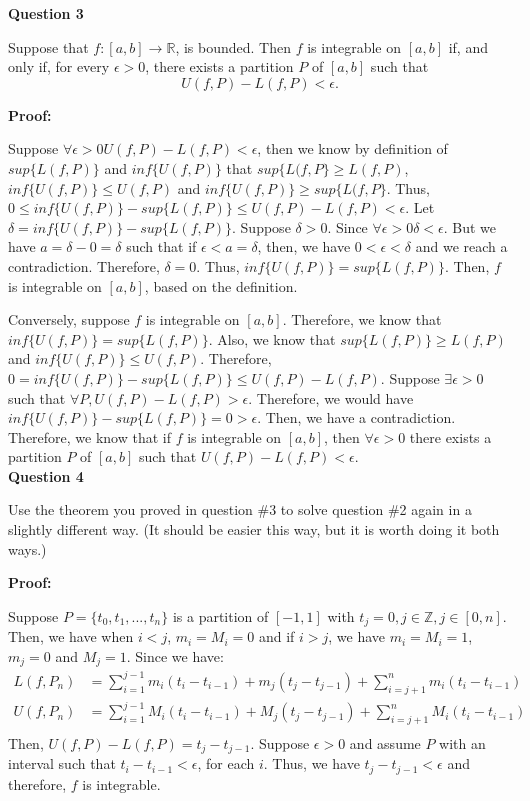 \documentclass[a4paper,12pt]{report}
\newcommand{\R}{\mathbb{R}}
\begin{document}
\noindent
\textbf{Question 3}

\noindent
Suppose that $f:[a,b]\to\R$,
is bounded. Then $f$ is integrable on $[a,b]$
if, and only if, for every $\epsilon>0$, there
exists a partition $P$ of $[a,b]$ such
that
\[
U(f,P)-L(f,P)<\epsilon.
\]

\noindent
\textbf{Proof: }

\noindent
Suppose $\forall \epsilon > 0U(f,P)-L(f,P)<\epsilon $, then we know by definition of $sup\{L(f,P)\}$ and $inf\{U(f,P)\}$ that $sup\{L(f,P\}\geq L(f,P)$, $inf\{U(f,P)\}\leq U(f,P)$ and $inf\{U(f,P)\}\geq sup\{L(f,P\}$. Thus, $0\leq inf\{U(f,P)\}-sup\{L(f,P)\}\leq U(f,P)-L(f,P)<\epsilon$. Let $\delta=inf\{U(f,P)\}-sup\{L(f,P)\}$. Suppose $\delta > 0$. Since $\forall \epsilon>0 \delta<\epsilon$. But we have $a=\delta-0=\delta$ such that if $\epsilon<a=\delta$, then, we have $0<\epsilon<\delta$ and we reach a contradiction. Therefore, $\delta=0$. Thus, $inf\{U(f,P)\} = sup\{L(f,P)\}$. Then, $f$ is integrable on $[a,b]$, based on the definition. 

\noindent
Conversely, suppose $f$ is integrable on $[a,b]$. Therefore, we know that $inf\{U(f,P)\} = sup\{L(f,P)\}$. Also, we know that  $sup\{L(f,P)\}\geq L(f,P)$ and $inf\{U(f,P)\}\leq U(f,P)$. Therefore, $0=inf\{U(f,P)\}-sup\{L(f,P)\}\leq U(f,P)-L(f,P)$. Suppose $\exists \epsilon>0$ such that $\forall P, U(f,P)-L(f,P)>\epsilon$. Therefore, we would have $inf\{U(f,P)\}-sup\{L(f,P)\} = 0>\epsilon$. Then, we have a contradiction. Therefore, we know that if $f$ is integrable on $[a,b]$, then $\forall \epsilon >0$ there
exists a partition $P$ of $[a,b]$ such
that
$
U(f,P)-L(f,P)<\epsilon.
$\\

\noindent
\textbf{Question 4}

\noindent
Use the theorem you proved in 
question \#3 to solve 
question \#2 again 
in a slightly different way. (It 
should be easier this way, but it is
worth doing it both ways.)

\noindent
\textbf{Proof: }

\noindent
Suppose $P=\{t_0,t_1,...,t_n\}$ is a partition of $[-1,1]$ with $t_j = 0, j \in \mathbb{Z}, j \in [0,n]$. Then, we have when $i<j$, $m_i=M_i=0$ and if $i>j$, we have $m_i=M_i=1$, $m_j=0$ and $M_j=1$. Since we have:
\begin{align*}
L(f,P_n)&=\sum_{i=1}^{j-1}m_i(t_i-t_{i-1})+m_j(t_j-t_{j-1})+\sum_{i=j+1}^{n}m_i(t_i-t_{i-1})\\
U(f,P_n)&=\sum_{i=1}^{j-1}M_i(t_i-t_{i-1})+M_j(t_j-t_{j-1})+\sum_{i=j+1}^{n}M_i(t_i-t_{i-1})\\
\end{align*}
Then, $U(f,P)-L(f,P)=t_j-t_{j-1}$. Suppose $\epsilon >0$ and assume $P$ with an interval such that $t_i-t_{i-1}<\epsilon$, for each $i$. Thus, we have $t_j-t_{j-1}<\epsilon$ and therefore, $f$ is integrable. \\
\end{document}
